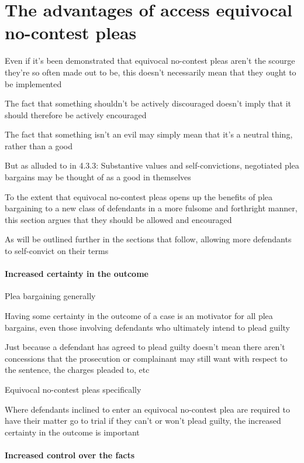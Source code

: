 \section{The advantages of access equivocal no-contest pleas}

Even if it's been demonstrated that equivocal no-contest pleas aren't the scourge they're so often made out to be, this doesn't necessarily mean that they ought to be implemented

The fact that something shouldn't be actively discouraged doesn't imply that it should therefore be actively encouraged

The fact that something isn't an evil may simply mean that it's a neutral thing, rather than a good

But as alluded to in 4.3.3: Substantive values and self-convictions, negotiated plea bargains may be thought of as a good in themselves

To the extent that equivocal no-contest pleas opens up the benefits of plea bargaining to a new class of defendants in a more fulsome and forthright manner, this section argues that they should be allowed and encouraged

As will be outlined further in the sections that follow, allowing more defendants to self-convict on their terms

\paragraph{Increased certainty in the outcome\\}

Plea bargaining generally

Having some certainty in the outcome of a case is an motivator for all plea bargains, even those involving defendants who ultimately intend to plead guilty

Just because a defendant has agreed to plead guilty doesn't mean there aren't concessions that the prosecution or complainant may still want with respect to the sentence, the charges pleaded to, etc

Equivocal no-contest pleas specifically

Where defendants inclined to enter an equivocal no-contest plea are required to have their matter go to trial if they can't or won't plead guilty, the increased certainty in the outcome is  important

\paragraph{Increased control over the facts\\}

